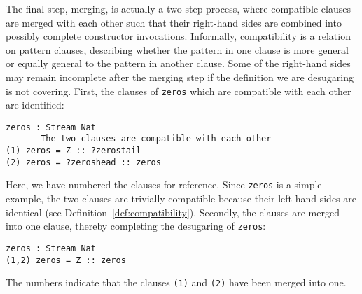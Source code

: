 

The final step, merging, is actually a two-step process, where compatible
clauses are merged with each other such that their right-hand sides are combined
into possibly complete constructor invocations. Informally, compatibility is a relation on
pattern clauses, describing whether the pattern in one clause is more general or
equally general to the pattern in another clause. Some of the right-hand sides
may remain incomplete after the merging step if the definition we are desugaring
is not covering. First, the clauses of \texttt{zeros} which are compatible with
each other are identified:
\begin{lstlisting}[mathescape]
    zeros : Stream Nat
    -- The two clauses are compatible with each other
(1) zeros = Z :: ?zerostail
(2) zeros = ?zeroshead :: zeros
\end{lstlisting}
Here, we have numbered the clauses for reference. Since \texttt{zeros} is a simple
example, the two clauses are trivially compatible because their left-hand sides
are identical (see Definition~\ref{def:compatibility}). Secondly, the clauses are merged into one clause, thereby completing the
desugaring of \texttt{zeros}:
\begin{lstlisting}[mathescape]
      zeros : Stream Nat
(1,2) zeros = Z :: zeros 
\end{lstlisting}
The numbers indicate that the clauses \texttt{(1)} and \texttt{(2)} have been
merged into one.

